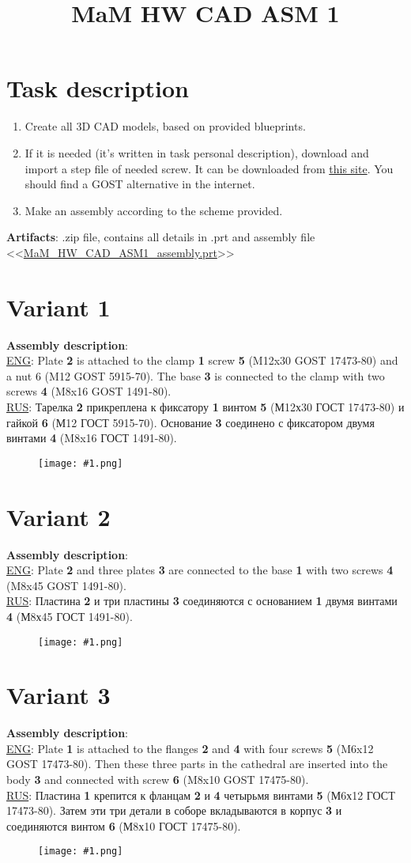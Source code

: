 \documentclass{article}
\title{MaM HW CAD ASM 1} %
\author{} %
\date{}
\newcommand\ttask[3] 
 {
	\section*{Variant #1}
	\textbf{Assembly description}: \\
	\underline{ENG}: #2 \smallskip \\ 
	\underline{RUS}: #3
	\begin{figure}[H]
		\centering\texttt{[image: \#1.png]}
		\label{fig:#1.png}
	\end{figure}
	\newpage
 }
\begin{document}
	\maketitle %
    
	\section{Task description}
	\begin{enumerate}
		\item Create all 3D CAD models, based on provided blueprints.
		\item If it is needed (it's written in task personal description), download and import a step file of needed screw. It can be downloaded from \href{https://www.mcmaster.com/}{this site}. You should find a GOST alternative in the internet. 
		\item Make an assembly according to the scheme provided.
	\end{enumerate}
	\textbf{Artifacts}: .zip file, contains all details in .prt and assembly file <<\url{MaM_HW_CAD_ASM1_assembly.prt}>>

	\newpage
	\ttask{1}{Plate \textbf{2} is attached to the clamp \textbf{1} screw \textbf{5} (M12x30 GOST 17473-80) and a nut 6 (M12 GOST 5915-70). The base \textbf{3} is connected to the clamp with two screws \textbf{4} (M8x16 GOST 1491-80).}{Тарелка \textbf{2} прикреплена к фиксатору \textbf{1} винтом \textbf{5} (М12х30 ГОСТ 17473-80) и гайкой \textbf{6} (М12 ГОСТ 5915-70). Основание \textbf{3} соединено с фиксатором двумя винтами \textbf{4} (M8x16 ГОСТ 1491-80).}
	
	\ttask{2}{Plate \textbf{2} and three plates \textbf{3} are connected to the base \textbf{1} with two screws \textbf{4} (M8x45 GOST 1491-80).}{Пластина \textbf{2} и три пластины \textbf{3} соединяются с основанием \textbf{1} двумя винтами \textbf{4} (М8х45 ГОСТ 1491-80).}

	\ttask{3}{Plate \textbf{1} is attached to the flanges \textbf{2} and \textbf{4} with four screws \textbf{5} (M6x12 GOST 17473-80). Then these three parts in the cathedral are inserted into the body \textbf{3} and connected with screw \textbf{6} (M8x10 GOST 17475-80).}{Пластина \textbf{1} крепится к фланцам \textbf{2} и \textbf{4} четырьмя винтами \textbf{5} (М6х12 ГОСТ 17473-80). Затем эти три детали в соборе вкладываются в корпус \textbf{3} и соединяются винтом \textbf{6} (М8х10 ГОСТ 17475-80).}
\end{document}
